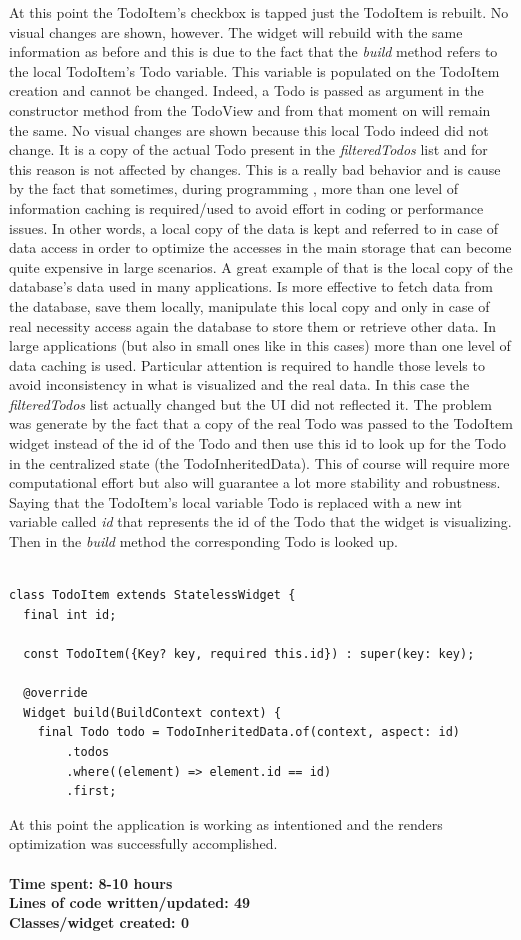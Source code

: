 At this point the TodoItem’s checkbox is tapped just the TodoItem is rebuilt. No visual changes are shown, however. The widget will rebuild with the same information as before and this is due to the fact that the \textit{build} method refers to the local TodoItem's Todo variable. This variable is populated on the TodoItem creation and cannot be changed. Indeed, a Todo is passed as argument in the constructor method from the TodoView and from that moment on will remain the same. No visual changes are shown because this local Todo indeed did not change. It is a copy of the actual Todo present in the \textit{filteredTodos} list and for this reason is not affected by changes. This is a really bad behavior and is cause by the fact that sometimes, during programming , more than one level of information caching is required/used to avoid effort in coding or performance issues. In other words, a local copy of the data is kept and referred to in case of data access in order to optimize the accesses in the main storage that can become quite expensive in large scenarios. A great example of that is the local copy of the database’s data used in many applications. Is more effective to fetch data from the database, save them locally, manipulate this local copy and only in case of real necessity access again the database to store them or retrieve other data. In large applications (but also in small ones like in this cases) more than one level of data caching is used. Particular attention is required to handle those levels to avoid inconsistency in what is visualized and the real data. In this case the \textit{filteredTodos} list actually changed but the UI did not reflected it. The problem was generate by the fact that a copy of the real Todo was passed to the TodoItem widget instead of the id of the Todo and then use this id to look up for the Todo in the centralized state (the TodoInheritedData). This of course will require more computational effort but also will guarantee a lot more stability and robustness. 
Saying that the TodoItem’s local variable Todo is replaced with a new int variable called \textit{id} that represents the id of the Todo that the widget is visualizing. Then in the \textit{build} method the corresponding Todo is looked up.


\begin{code}
\begin{verbatim}

class TodoItem extends StatelessWidget {
  final int id;

  const TodoItem({Key? key, required this.id}) : super(key: key);

  @override
  Widget build(BuildContext context) {
    final Todo todo = TodoInheritedData.of(context, aspect: id)
        .todos
        .where((element) => element.id == id)
        .first;
\end{verbatim}
\end{code}

At this point the application is working as intentioned and the renders optimization was successfully accomplished. \\
\\
\textbf{Time spent: 8-10 hours\\
Lines of code written/updated: 49\\ 
Classes/widget created: 0 \\
}





